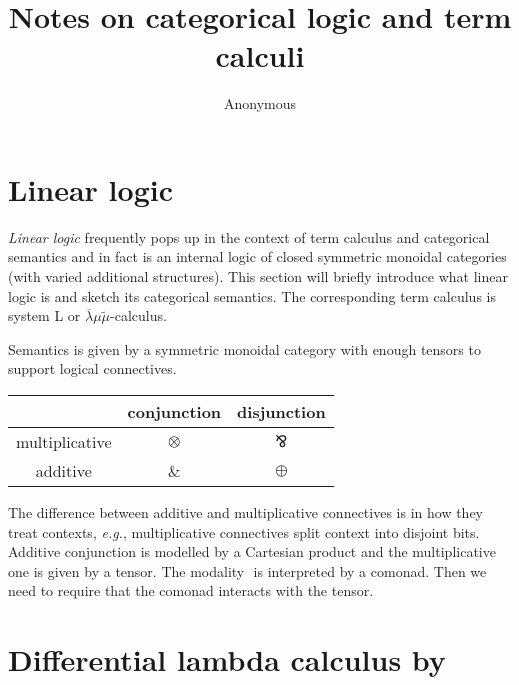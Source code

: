 \documentclass[acmsmall,screen, nonacm, anonymous]{acmart}
\newcommand{\parr}{\mathbin{\bindnasrepma}}
\begin{document}
\title{Notes on categorical logic and term calculi}

\author{Anonymous}


\maketitle

\section{Linear logic}


\textit{Linear logic} frequently pops up in the context of term calculus and categorical semantics and in fact is an internal logic of closed symmetric monoidal categories (with varied additional structures).
This section will briefly introduce what linear logic is and sketch its categorical semantics.
The corresponding term calculus is system L or $\overline{\lambda}\mu\widetilde{\mu}$-calculus.

Semantics is given by a symmetric monoidal category with enough tensors to support logical connectives.

\begin{center}
\begin{tabular}{c|cc}
{}& conjunction & disjunction\\
\hline
multiplicative & $\otimes$ & $\parr$\\
additive & $\&$ & $\oplus$\\
\end{tabular}
\end{center}

The difference between additive and multiplicative connectives is in how they treat contexts, \textit{e.g.}, multiplicative connectives split context into disjoint bits.
Additive conjunction is modelled by a Cartesian product and the multiplicative one is given by a tensor.
The modality $\!$ is interpreted by a comonad. 
Then we need to require that the comonad interacts with the tensor.


\section{Differential lambda calculus by ~\citet{DiffLambdaCalc}}
\end{document}
